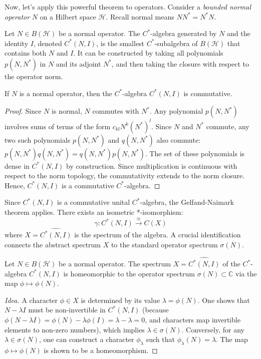 Now, let's apply this powerful theorem to operators. Consider a \textit{bounded normal operator} $N$ on a Hilbert space $\mathcal{H}$. Recall normal means $NN^* = N^*N$.

\begin{definition}
Let $N \in B(\mathcal{H})$ be a normal operator. The $C^*$-algebra generated by $N$ and the identity $I$, denoted $C^*(N, I)$, is the smallest $C^*$-subalgebra of $B(\mathcal{H})$ that contains both $N$ and $I$. It can be constructed by taking all polynomials $p(N, N^*)$ in $N$ and its adjoint $N^*$, and then taking the closure with respect to the operator norm.
\end{definition}

\begin{proposition}
If $N$ is a normal operator, then the $C^*$-algebra $C^*(N, I)$ is commutative.
\end{proposition}
\begin{proof}
Since $N$ is normal, $N$ commutes with $N^*$. Any polynomial $p(N, N^*)$ involves sums of terms of the form $c_{kl} N^k (N^*)^l$. Since $N$ and $N^*$ commute, any two such polynomials $p(N, N^*)$ and $q(N, N^*)$ also commute: $p(N, N^*) q(N, N^*) = q(N, N^*) p(N, N^*)$. The set of these polynomials is dense in $C^*(N, I)$ by construction. Since multiplication is continuous with respect to the norm topology, the commutativity extends to the norm closure. Hence, $C^*(N, I)$ is a commutative $C^*$-algebra.
\end{proof}

Since $C^*(N, I)$ is a commutative unital $C^*$-algebra, the Gelfand-Naimark theorem applies. There exists an isometric *-isomorphism:
\[ \gamma: C^*(N, I) \xrightarrow{\cong} C(X) \]
where $X = \widehat{C^*(N, I)}$ is the spectrum of the algebra. A crucial identification connects the abstract spectrum $X$ to the standard operator spectrum $\sigma(N)$.

\begin{theorem}
Let $N \in B(\mathcal{H})$ be a normal operator. The spectrum $X = \widehat{C^*(N, I)}$ of the $C^*$-algebra $C^*(N, I)$ is homeomorphic to the operator spectrum $\sigma(N) \subset \mathbb{C}$ via the map $\phi \mapsto \phi(N)$.
\end{theorem}
\begin{proof}[Idea]
A character $\phi \in X$ is determined by its value $\lambda = \phi(N)$. One shows that $N - \lambda I$ must be non-invertible in $C^*(N, I)$ (because $\phi(N-\lambda I) = \phi(N) - \lambda \phi(I) = \lambda - \lambda = 0$, and characters map invertible elements to non-zero numbers), which implies $\lambda \in \sigma(N)$. Conversely, for any $\lambda \in \sigma(N)$, one can construct a character $\phi_\lambda$ such that $\phi_\lambda(N) = \lambda$. The map $\phi \mapsto \phi(N)$ is shown to be a homeomorphism.
\end{proof}


